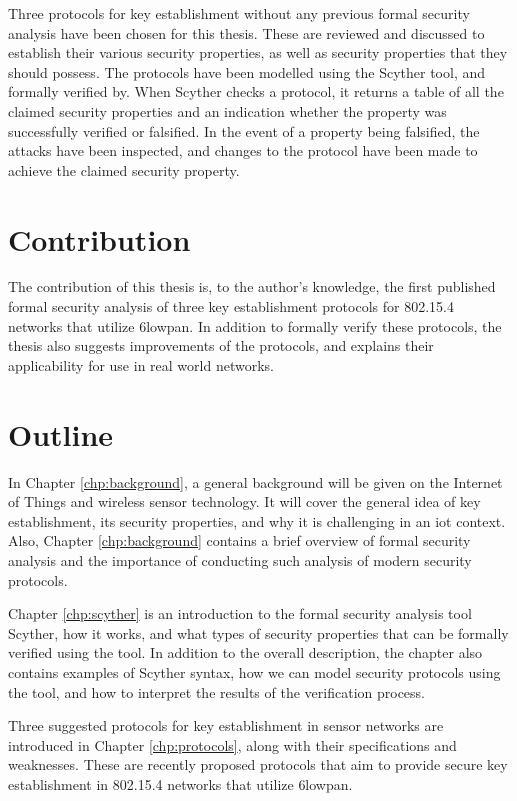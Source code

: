 Three protocols for key establishment without any previous formal security analysis have been chosen for this thesis. These are reviewed and discussed to establish their various security properties, as well as security properties that they should possess. The protocols have been modelled using the Scyther tool, and formally verified by. When Scyther checks a protocol, it returns a table of all the claimed security properties and an indication whether the property was successfully verified or falsified. In the event of a property being falsified, the attacks have been inspected, and changes to the protocol have been made to achieve the claimed security property. 

\section{Contribution}

The contribution of this thesis is, to the author's knowledge, the first published formal security analysis of three key establishment protocols for 802.15.4 networks that utilize \gls{6lowpan}. In addition to formally verify these protocols, the thesis also suggests improvements of the protocols, and explains their applicability for use in real world networks.


\section{Outline}

In Chapter \ref{chp:background}, a general background will be given on the Internet of Things and wireless sensor technology. It will cover the general idea of key establishment, its security properties, and why it is challenging in an \gls{iot} context. Also, Chapter \ref{chp:background} contains a brief overview of formal security analysis and the importance of conducting such analysis of modern security protocols.

Chapter \ref{chp:scyther} is an introduction to the formal security analysis tool Scyther, how it works, and what types of security properties that can be formally verified using the tool. In addition to the overall description, the chapter also contains examples of Scyther syntax, how we can model security protocols using the tool, and how to interpret the results of the verification process.

Three suggested protocols for key establishment in sensor networks are introduced in Chapter \ref{chp:protocols}, along with their specifications and weaknesses. These are recently proposed protocols that aim to provide secure key establishment in 802.15.4 networks that utilize \gls{6lowpan}.

